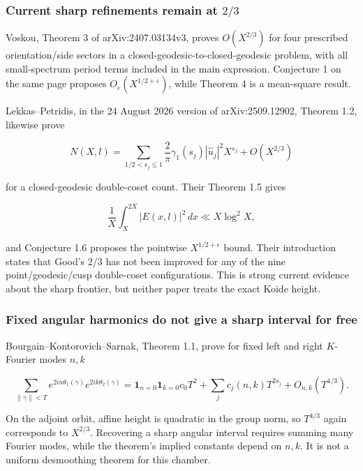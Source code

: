 \subsubsection{\texorpdfstring{Current sharp refinements remain at \(2/3\)}{Current sharp refinements remain at 2/3}}\label{koide-lit-current-sharp-refinements-remain-at-23}

Voskou, Theorem 3 of arXiv:2407.03134v3, proves \(O(X^{2/3})\) for four prescribed orientation/side sectors in a closed-geodesic-to-closed-geodesic problem, with all small-spectrum period terms included in the main expression. Conjecture 1 on the same page proposes \(O_\varepsilon(X^{1/2+\varepsilon})\), while Theorem 4 is a mean-square result.

Lekkas--Petridis, in the 24 August 2026 version of arXiv:2509.12902, Theorem 1.2, likewise prove

\[
 N(X,l)=\sum_{1/2<s_j\leq1}
 \frac2\pi\gamma_1(s_j)|\widehat u_j|^2X^{s_j}
 +O(X^{2/3})
\]

for a closed-geodesic double-coset count. Their Theorem 1.5 gives

\[
 \frac1X\int_X^{2X}|E(x,l)|^2\,dx\ll X\log^2X,
\]

and Conjecture 1.6 proposes the pointwise \(X^{1/2+\epsilon}\) bound. Their introduction states that Good's \(2/3\) has not been improved for any of the nine point/geodesic/cusp double-coset configurations. This is strong current evidence about the sharp frontier, but neither paper treats the exact Koide height.

\subsubsection{Fixed angular harmonics do not give a sharp interval for free}\label{koide-lit-fixed-angular-harmonics-do-not-give-a-sharp-interval-for-free}

Bourgain--Kontorovich--Sarnak, Theorem 1.1, prove for fixed left and right \(K\)-Fourier modes \(n,k\)

\[
 \sum_{\|\gamma\|<T}e^{2in\theta_1(\gamma)}e^{2ik\theta_2(\gamma)}
 =\mathbf1_{n=0}\mathbf1_{k=0}c_0T^2
  +\sum_jc_j(n,k)T^{2s_j}+O_{n,k}(T^{4/3}).
\]

On the adjoint orbit, affine height is quadratic in the group norm, so \(T^{4/3}\) again corresponds to \(X^{2/3}\). Recovering a sharp angular interval requires summing many Fourier modes, while the theorem's implied constants depend on \(n,k\). It is not a uniform desmoothing theorem for this chamber.

